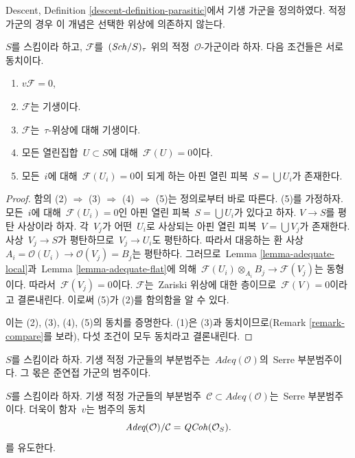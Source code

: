 \medskip\noindent
Descent, Definition \ref{descent-definition-parasitic}에서 기생 가군을
정의하였다. 적정 가군의 경우 이 개념은 선택한 위상에 의존하지 않는다.

\begin{lemma}
\label{lemma-parasitic-adequate}
$S$를 스킴이라 하고, $\mathcal{F}$를\  $(\mathit{Sch}/S)_\tau$ 위의 적정\ 
$\mathcal{O}$-가군이라 하자. 다음 조건들은 서로 동치이다.
\begin{enumerate}
\item $v\mathcal{F} = 0$,
\item $\mathcal{F}$는 기생이다.
\item $\mathcal{F}$는\  $\tau$-위상에 대해 기생이다.
\item 모든 열린집합\  $U \subset S$에 대해\  $\mathcal{F}(U) = 0$이다.
\item 모든\  $i$에 대해\  $\mathcal{F}(U_i) = 0$이 되게 하는 아핀 열린
피복\  $S = \bigcup U_i$가 존재한다.
\end{enumerate}
\end{lemma}

\begin{proof}
함의 (2) $\Rightarrow$ (3) $\Rightarrow$ (4) $\Rightarrow$ (5)는
정의로부터 바로 따른다. (5)를 가정하자. 모든\  $i$에 대해\ 
$\mathcal{F}(U_i) = 0$인 아핀 열린 피복\  $S = \bigcup U_i$가 있다고
하자. $V \to S$를 평탄 사상이라 하자. 각\  $V_j$가 어떤\  $U_i$로
사상되는 아핀 열린 피복\  $V = \bigcup V_j$가 존재한다. 사상\ 
$V_j \to S$가 평탄하므로\  $V_j \to U_i$도 평탄하다. 따라서 대응하는
환 사상\  $A_i = \mathcal{O}(U_i) \to \mathcal{O}(V_j) = B_j$는
평탄하다. 그러므로\  Lemma \ref{lemma-adequate-local}과\ 
Lemma \ref{lemma-adequate-flat}에 의해\ 
$\mathcal{F}(U_i) \otimes_{A_i} B_j \to \mathcal{F}(V_j)$는
동형이다. 따라서\  $\mathcal{F}(V_j) = 0$이다. $\mathcal{F}$는\ 
Zariski 위상에 대한 층이므로\  $\mathcal{F}(V) = 0$이라고 결론내린다.
이로써 (5)가 (2)를 함의함을 알 수 있다.

\medskip\noindent
이는 (2), (3), (4), (5)의 동치를 증명한다. (1)은 (3)과
동치이므로(Remark \ref{remark-compare}를 보라), 다섯 조건이 모두
동치라고 결론내린다.
\end{proof}

\noindent
$S$를 스킴이라 하자. 기생 적정 가군들의 부분범주는\ 
$\textit{Adeq}(\mathcal{O})$의\  Serre 부분범주이다. 그 몫은
준연접 가군의 범주이다.

\begin{lemma}
\label{lemma-adequate-by-parasitic}
$S$를 스킴이라 하자. 기생 적정 가군들의 부분범주\ 
$\mathcal{C} \subset \textit{Adeq}(\mathcal{O})$는\  Serre
부분범주이다. 더욱이 함자\  $v$는 범주의 동치
$$
\textit{Adeq}(\mathcal{O}) / \mathcal{C} = \mathit{QCoh}(\mathcal{O}_S).
$$
를 유도한다.
\end{lemma}


